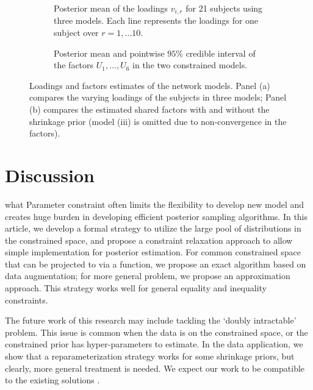 \documentclass[10pt,fleqn]{article}
\DeclareMathOperator{\1}{\mathbbm{1}}
\begin{document}
\begin{figure}[H]
\centering
\begin{subfigure}[b]{0.8\textwidth}
\caption{Posterior mean of the loadings $v_{i,r}$ for 21 subjects using three
models. Each line represents the loadings for one subject over $r=1,\ldots10$.}
\end{subfigure}
\begin{subfigure}[b]{1\textwidth}
\caption{Posterior mean and pointwise $95\%$ credible interval of  the factors
$U_1,\ldots,
U_6$ in the two constrained models. }
\end{subfigure}
\caption{Loadings and factors estimates of the network models. Panel (a) compares
the varying loadings of the subjects in three models; Panel (b) compares
the estimated shared factors with and without the shrinkage prior (model (iii) is omitted due to non-convergence in the factors). \label{network_model_basis}}
\end{figure}




\section{Discussion}

what
Parameter constraint often limits the flexibility to develop new model and creates huge burden in developing efficient posterior sampling algorithms. In this article, we develop a formal strategy to utilize the large pool of distributions in the constrained space, and propose a constraint relaxation approach to allow simple implementation for posterior estimation. For common constrained space that can be projected to via a function, we propose an exact algorithm based on data augmentation; for more general problem, we propose an approximation approach.
This strategy works well for general equality and inequality constraints.


The future work of this research may include tackling the  `doubly intractable' problem. This issue is common when the data is on the constrained space, or the constrained prior has hyper-parameters to estimate. In the data application, we show that a reparameterization strategy works for some shrinkage priors, but clearly, 
more general treatment is needed. We expect our work to be compatible to the existing solutions \citep{murray2012mcmc,rao2016data, stoehr2017noisy}. 
\end{document}
